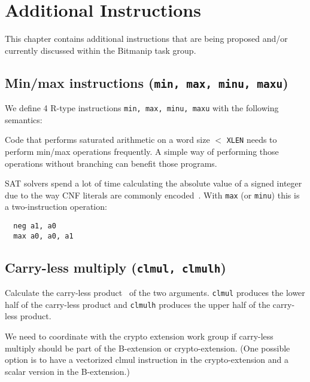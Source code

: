\chapter{Additional Instructions}

This chapter contains additional instructions that are being proposed and/or
currently discussed within the Bitmanip task group.


\section{Min/max instructions (\texttt{min, max, minu, maxu})}

We define 4 R-type instructions \texttt{min, max, minu, maxu} with the
following semantics:



Code that performs saturated arithmetic on a word size $<$ \texttt{XLEN} needs to perform
min/max operations frequently. A simple way of performing those operations without branching
can benefit those programs.

SAT solvers spend a lot of time calculating the absolute value of a signed
integer due to the way CNF literals are commonly encoded~\cite{BiereComm}. With
\texttt{max} (or \texttt{minu}) this is a two-instruction operation:

\begin{verbatim}
  neg a1, a0
  max a0, a0, a1
\end{verbatim}




\section{Carry-less multiply (\texttt{clmul, clmulh})}

Calculate the carry-less product~\cite{CarryLessProduct} of the two arguments. \texttt{clmul}
produces the lower half of the carry-less product and \texttt{clmulh} produces the upper half
of the carry-less product.

We need to coordinate with the crypto extension work group if carry-less multiply should
be part of the B-extension or crypto-extension. (One possible option is to have a vectorized
clmul instruction in the crypto-extension and a scalar version in the B-extension.)

